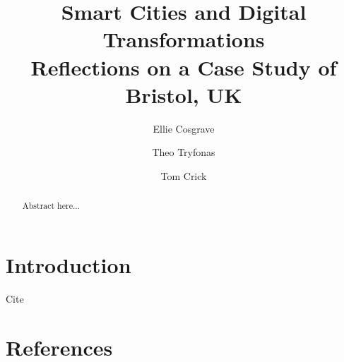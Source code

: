 \documentclass[review]{elsarticle}
\begin{document}
\begin{frontmatter}

\title{Smart Cities and Digital Transformations\\Reflections on a Case
  Study of Bristol, UK}

\author[add1]{Ellie Cosgrave}
\author[add2]{Theo Tryfonas}
\author[add3]{Tom Crick}

\address[add1]{Department of Science, Technology, Engineering \&
  Public Policy, UCL, UK}
\address[add2]{Faculty of Engineering, University of Bristol, UK}
\address[add3]{Department of Computing, Cardiff Metropolitan
  University, UK}


\begin{abstract}
Abstract here...
\end{abstract}

\begin{keyword}
\end{keyword}

\end{frontmatter}

\linenumbers

\section{Introduction}

Cite~\cite{cosgrave-et-al:2014}

\section*{References}


\end{document}
